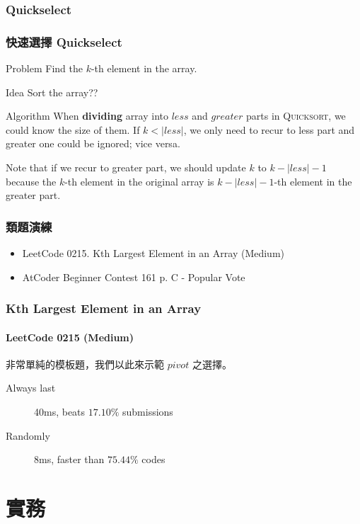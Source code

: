 \documentclass{beamer}
\begin{document}
\subsubsection{Quickselect}

\frame
{
	\frametitle{快速選擇 Quickselect}
	
	\begin{block}{Problem}
		Find the $k$-th element in the array.
	\end{block}
	\pause
	
	\begin{block}{Idea}
		Sort the array??
	\end{block}
	\pause
	
	\begin{block}{Algorithm}
		When \textbf{dividing} array into $less$ and $greater$ parts in \textsc{Quicksort}, we could know the size of them. If $k < |less|$, we only need to recur to less part and greater one could be ignored; vice versa.
		
		Note that if we recur to greater part, we should update $k$ to $k - |less| - 1$ because the $k$-th element in the original array is $k - |less| - 1$-th element in the greater part.
	\end{block}
}

\frame
{
	\frametitle{類題演練}
	
	\begin{itemize}
		\item LeetCode 0215. Kth Largest Element in an Array (Medium)
		\item AtCoder Beginner Contest 161 p. C - Popular Vote
	\end{itemize}
}

\frame
{
	\frametitle{Kth Largest Element in an Array}
	\framesubtitle{LeetCode 0215 (Medium)}
	
	非常單純的模板題，我們以此來示範 $pivot$ 之選擇。
	
	\begin{description}
		\item[Always last] 40ms, beats $17.10\%$ submissions
		\item[Randomly] 8ms, faster than $75.44\%$ codes
	\end{description}
}

\section{實務}
\end{document}
